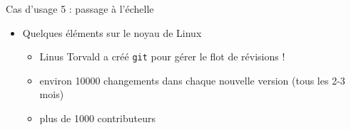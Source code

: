 \begin{frame}[fragile]{%
\protect\hypertarget{cas-dusage-5-passage-uxe0-luxe9chelle}{%
Cas d’usage 5 : passage à l’échelle}}

\begin{itemize}
\tightlist
\item
  Quelques éléments sur le noyau de Linux

  \begin{itemize}
  \tightlist
  \item
    Linus Torvald a créé \texttt{git} pour gérer le flot de révisions !
  \item
    environ 10000 changements dans chaque nouvelle version (tous les 2-3
    mois)
  \item
    plus de 1000 contributeurs
  \end{itemize}
\end{itemize}

\end{frame}

